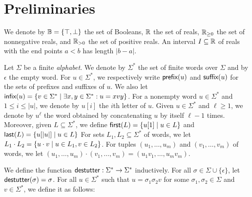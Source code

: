 \section{Preliminaries} \label{sec:preliminaries}

%
We denote by $\mathbb{B} = \{ \top, \bot \}$ the set of Booleans, $\mathbb{R}$ the set of reals, $\mathbb{R}_{\geq 0}$ the set of nonnegative reals, and $\mathbb{R}_{> 0}$ the 
set of positive reals.
%
An interval $I \subseteq \mathbb{R}$ of reals with the end points $a < b$ has length $|b-a|$.

Let $\Sigma$ be a finite {\em alphabet}.
%
We denote by $\Sigma^*$ the set of finite words over $\Sigma$ and by $\epsilon$ the empty word.
%
For $u \in \Sigma^*$, we respectively write $\textsf{prefix}(u)$ and $\textsf{suffix}(u)$ for the sets of prefixes 
and suffixes of $u$.
%
We also let $\infx(u) = \{v \in \Sigma^* \st \exists x,y \in \Sigma^* : u = xvy\}$.
%
For a nonempty word $u \in \Sigma^*$ and $1 \leq i \leq |u|$, we denote by $u[i]$ the $i$th letter of $u$.
%
Given $u \in \Sigma^*$ and $\ell \geq 1$, we denote by $u^\ell$ the word obtained by concatenating $u$ by itself $\ell - 1$ times.
Moreover, given $L \subseteq \Sigma^*$, we define $\first(L) = \{ u[1] \st u \in L\}$ and $\last(L) = \{ u[|u|] \st u \in L\}$
For sets $L_1, L_2 \subseteq \Sigma^*$ of words, we let $L_1 \cdot L_2 = \{u \cdot v \st u \in L_1, v \in L_2\}$.
For tuples $(u_1, \ldots, u_m)$ and $(v_1, \ldots, v_m)$ of words, we let $(u_1, \ldots, u_m) \cdot (v_1, \ldots, v_m) = (u_1 v_1, \ldots, u_m v_m)$.

We define the function $\mathsf{destutter} : \Sigma^* \to \Sigma^*$ inductively.
For all $\sigma \in \Sigma \cup \{\epsilon\}$, let $\mathsf{destutter}(\sigma) = \sigma$.
For all $u \in \Sigma^*$ such that $u = \sigma_1 \sigma_2 v$ for some $\sigma_1,\sigma_2 \in 
\Sigma$ and $v \in \Sigma^*$, we define it as follows:

